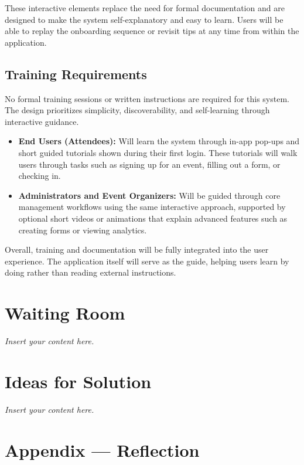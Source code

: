 \documentclass[12pt]{article}
\newcommand{\lips}{\textit{Insert your content here.}}
\begin{document}
These interactive elements replace the need for formal documentation and are designed to make the system self-explanatory and easy to learn.  
Users will be able to replay the onboarding sequence or revisit tips at any time from within the application.

\subsection{Training Requirements}

No formal training sessions or written instructions are required for this system.  
The design prioritizes simplicity, discoverability, and self-learning through interactive guidance.

\begin{itemize}
    \item \textbf{End Users (Attendees):}  
    Will learn the system through in-app pop-ups and short guided tutorials shown during their first login.  
    These tutorials will walk users through tasks such as signing up for an event, filling out a form, or checking in.

    \item \textbf{Administrators and Event Organizers:}  
    Will be guided through core management workflows using the same interactive approach, supported by optional short videos or animations that explain advanced features such as creating forms or viewing analytics.
\end{itemize}

Overall, training and documentation will be fully integrated into the user experience.  
The application itself will serve as the guide, helping users learn by doing rather than reading external instructions.


\section{Waiting Room}
\lips

\section{Ideas for Solution}
\lips

\newpage{}
\section*{Appendix --- Reflection}




\end{document}
